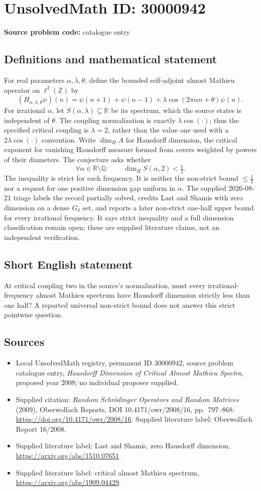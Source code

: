 \documentclass[11pt]{article}
\newcommand{\Z}{\mathbb{Z}}
\newcommand{\Q}{\mathbb{Q}}
\newcommand{\R}{\mathbb{R}}
\begin{document}
\section*{UnsolvedMath ID: 30000942}
\textbf{Source problem code:} catalogue entry
\subsection{Definitions and mathematical statement}
For real parameters $\alpha,\lambda,\theta$, define the bounded self-adjoint almost Mathieu operator on $\ell^2(\Z)$ by \[(H_{\alpha,\lambda,\theta}\psi)(n)=\psi(n+1)+\psi(n-1)+\lambda\cos(2\pi\alpha n+\theta)\psi(n).\] For irrational $\alpha$, let $S(\alpha,\lambda)\subseteq\R$ be its spectrum, which the source states is independent of $\theta$. The coupling normalization is exactly $\lambda\cos(\cdot)$; thus the specified critical coupling is $\lambda=2$, rather than the value one used with a $2\lambda\cos(\cdot)$ convention. Write $\dim_H A$ for Hausdorff dimension, the critical exponent for vanishing Hausdorff measure formed from covers weighted by powers of their diameters. The conjecture asks whether \[\forall\alpha\in\R\setminus\Q:\qquad\dim_H S(\alpha,2)<\tfrac12.\] The inequality is strict for each frequency. It is neither the non-strict bound $\leq\tfrac12$ nor a request for one positive dimension gap uniform in $\alpha$. The supplied 2026-08-21 triage labels the record partially solved, credits Last and Shamis with zero dimension on a dense $G_\delta$ set, and reports a later non-strict one-half upper bound for every irrational frequency. It says strict inequality and a full dimension classification remain open; these are supplied literature claims, not an independent verification.
\subsection{Short English statement}
At critical coupling two in the source's normalization, must every irrational-frequency almost Mathieu spectrum have Hausdorff dimension strictly less than one half? A reported universal non-strict bound does not answer this strict pointwise question.
\subsection{Sources}
\begin{itemize}\item Local UnsolvedMath registry, permanent ID 30000942, source problem catalogue entry, \emph{Hausdorff Dimension of Critical Almost Mathieu Spectra}, proposed year 2008; no individual proposer supplied.\item Supplied citation: \emph{Random Schr\"odinger Operators and Random Matrices} (2009), Oberwolfach Reports, DOI 10.4171/owr/2008/16, pp.\ 797--868: \url{https://doi.org/10.4171/owr/2008/16}. Supplied literature label: Oberwolfach Report 16/2008.\item Supplied literature label: Last and Shamis, zero Hausdorff dimension, \url{https://arxiv.org/abs/1510.07651}.\item Supplied literature label: critical almost Mathieu spectrum, \url{https://arxiv.org/abs/1909.04429}.\end{itemize}
\end{document}
